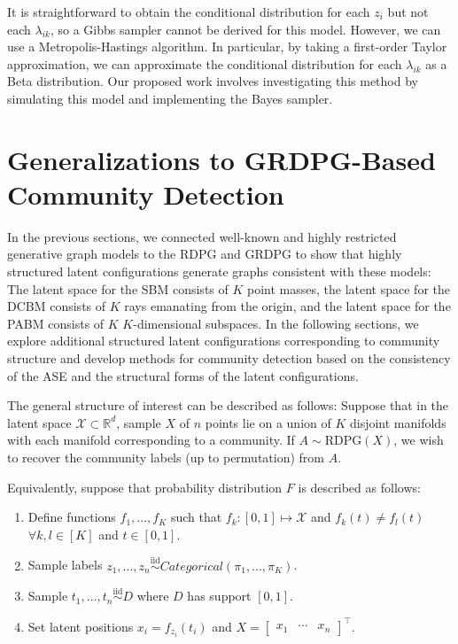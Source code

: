 \documentclass[
  11pt,
]{article}
\providecommand{\tightlist}{%
  \setlength{\itemsep}{0pt}\setlength{\parskip}{0pt}}
\begin{document}
It is straightforward to obtain the conditional distribution for each
\(z_i\) but not each \(\lambda_{ik}\), so a Gibbs sampler cannot be
derived for this model. However, we can use a Metropolis-Hastings
algorithm. In particular, by taking a first-order Taylor approximation,
we can approximate the conditional distribution for each
\(\lambda_{ik}\) as a Beta distribution. Our proposed work involves
investigating this method by simulating this model and implementing the
Bayes sampler.

\hypertarget{generalizations-to-grdpg-based-community-detection}{%
\section{Generalizations to GRDPG-Based Community
Detection}\label{generalizations-to-grdpg-based-community-detection}}

In the previous sections, we connected well-known and highly restricted
generative graph models to the RDPG and GRDPG to show that highly
structured latent configurations generate graphs consistent with these
models: The latent space for the SBM consists of \(K\) point masses, the
latent space for the DCBM consists of \(K\) rays emanating from the
origin, and the latent space for the PABM consists of \(K\)
\(K\)-dimensional subspaces. In the following sections, we explore
additional structured latent configurations corresponding to community
structure and develop methods for community detection based on the
consistency of the ASE and the structural forms of the latent
configurations.

The general structure of interest can be described as follows: Suppose
that in the latent space \(\mathcal{X} \subset \mathbb{R}^d\), sample
\(X\) of \(n\) points lie on a union of \(K\) disjoint manifolds with
each manifold corresponding to a community. If
\(A \sim \text{RDPG}(X)\), we wish to recover the community labels (up
to permutation) from \(A\).

Equivalently, suppose that probability distribution \(F\) is described
as follows:

\begin{enumerate}
\def\labelenumi{\arabic{enumi}.}
\tightlist
\item
  Define functions \(f_1, ..., f_K\) such that
  \(f_k : [0, 1] \mapsto \mathcal{X}\) and \(f_k(t) \neq f_l(t)\)
  \(\forall k, l \in [K]\) and \(t \in [0, 1]\).
\item
  Sample labels
  \(z_1, ..., z_n \stackrel{\text{iid}}{\sim}Categorical(\pi_1, ..., \pi_K)\).
\item
  Sample \(t_1, ..., t_n \stackrel{\text{iid}}{\sim}D\) where \(D\) has
  support \([0, 1]\).
\item
  Set latent positions \(x_i = f_{z_i}(t_i)\) and
  \(X = \begin{bmatrix} x_1 & \cdots & x_n \end{bmatrix}^\top\).
\end{enumerate}
\end{document}
